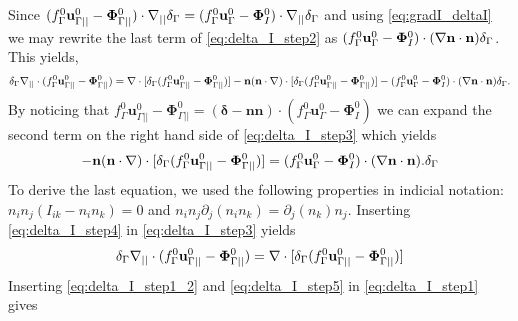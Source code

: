 Since $ (f_\Gamma^0 \textbf{u}_{\Gamma||}^0 - \mathbf{\Phi}_{\Gamma||}^0 )\cdot\mathbf{\nabla}_{||}\delta_\Gamma  = (f_\Gamma^0 \textbf{u}_\Gamma^0 - \mathbf{\Phi}_{I}^0 )\cdot\mathbf{\nabla}_{||}\delta_\Gamma$ and using \ref{eq:gradI_deltaI} we may rewrite the last term of \ref{eq:delta_I_step2} as $(f_\Gamma^0 \textbf{u}_\Gamma^0 - \mathbf{\Phi}_{I}^0 )\cdot(\mathbf{\nabla} \textbf{n}\cdot \textbf{n}) \delta_\Gamma$. This yields,
\begin{equation}
    \delta_\Gamma \divI (f_\Gamma^0 \textbf{u}_{\Gamma||}^0
    - \mathbf{\Phi}_{\Gamma||}^0 ) %
    = 
    \div [\delta_\Gamma (f_\Gamma^0 \textbf{u}_{\Gamma||}^0
    - \mathbf{\Phi}_{\Gamma||}^0 )]
    - \textbf{n}(\textbf{n}\cdot\grad)\cdot [\delta_\Gamma (f_\Gamma^0 \textbf{u}_{\Gamma||}^0
    - \mathbf{\Phi}_{\Gamma||}^0 )]
    - (f_\Gamma^0 \textbf{u}_\Gamma^0 - \mathbf{\Phi}_{I}^0 )\cdot(\grad \textbf{n}\cdot \textbf{n}) \delta_\Gamma.
\label{eq:delta_I_step3}
\end{equation}
By noticing that $f_\Gamma^0 \textbf{u}_{\Gamma||}^0
    - \mathbf{\Phi}_{\Gamma||}^0 = (\bm\delta - \textbf{nn})\cdot (f_\Gamma^0 \textbf{u}_\Gamma^0
    - \mathbf{\Phi}_{I}^0 )$ we can expand the second term on the right hand side of \ref{eq:delta_I_step3} which yields
\begin{equation}
    - \textbf{n}(\textbf{n}\cdot\grad)\cdot [\delta_\Gamma (f_\Gamma^0 \textbf{u}_{\Gamma||}^0
    - \mathbf{\Phi}_{\Gamma||}^0 )]
    = (f_\Gamma^0 \textbf{u}_\Gamma^0 - \mathbf{\Phi}_{I}^0 )\cdot(\grad \textbf{n}\cdot \textbf{n}). \delta_\Gamma%
\label{eq:delta_I_step4}
\end{equation}
To derive the last equation, we used the following properties in indicial notation: $n_in_j(I_{ik}-n_in_k) =0$ and $n_in_j\partial_{j}(n_in_k)=\partial_{j}(n_k)n_j$. Inserting \ref{eq:delta_I_step4} in \ref{eq:delta_I_step3} yields
\begin{equation}
    \delta_\Gamma \divI (f_\Gamma^0 \textbf{u}_{\Gamma||}^0
    - \mathbf{\Phi}_{\Gamma||}^0 ) %
    = 
    \div [\delta_\Gamma (f_\Gamma^0 \textbf{u}_{\Gamma||}^0
    - \mathbf{\Phi}_{\Gamma||}^0 )]
\label{eq:delta_I_step5}
\end{equation}
Inserting \ref{eq:delta_I_step1_2} and \ref{eq:delta_I_step5} in \ref{eq:delta_I_step1} gives

